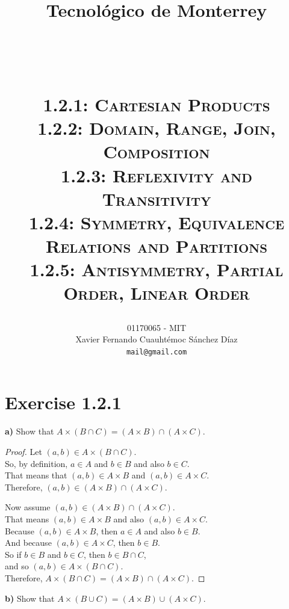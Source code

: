 \documentclass[titlepage, letterpaper, fleqn]{article}
\title{
\vspace{1in}
\textbf{Tecnológico de Monterrey} \\
\vspace{0.5in}
\textmd{\mahclass} \\
\large{\textit{\mahteacher}} \\
\vspace{0.5in}
\textsc{\mahtitle}\\
\textsc{1.2.1: Cartesian Products}\\
\textsc{1.2.2: Domain, Range, Join, Composition}\\
\textsc{1.2.3: Reflexivity and Transitivity}\\
\textsc{1.2.4: Symmetry, Equivalence Relations and Partitions}\\
\textsc{1.2.5: Antisymmetry, Partial Order, Linear Order}\\
\author{01170065  - MIT \\
Xavier Fernando Cuauhtémoc Sánchez Díaz \\
\texttt{mail@gmail.com}}
\date{\mahdate}
}
\newcommand{\spacepls}{\vspace{5mm}}
\begin{document}
\begin{titlepage}
\maketitle
\end{titlepage}

%
%

\section{Exercise 1.2.1}

{\large \textbf{a)} Show that \(A \times (B \cap C) = (A \times B) \cap (A \times C)\).}

\begin{proof}
Let \((a,b) \in A \times (B \cap C)\).\\
So, by definition, \(a \in A\) and \(b \in B\) and also \(b \in C\).\\
That means that \((a,b) \in A \times B\) and \((a,b) \in A \times C\).\\
Therefore, \((a,b) \in (A \times B) \cap (A \times C)\).

\spacepls

Now assume \((a,b) \in (A \times B) \cap (A \times C)\).\\
That means \((a,b) \in A \times B\) and also \((a,b) \in A \times C\).\\
Because \((a,b) \in A \times B\), then \(a \in A\) and also \(b \in B\).\\
And because \((a,b) \in A \times C\), then \(b \in B\).\\
So if \(b \in B\) and \(b \in C\), then \(b \in B \cap C\),\\
and so \((a,b) \in A \times (B \cap C)\).\\
Therefore, \(A \times (B \cap C) = (A \times B) \cap (A \times C)\).
\end{proof}

\spacepls

{\large \textbf{b)} Show that \(A \times (B \cup C) = (A \times B) \cup (A \times C)\).}
\end{document}
